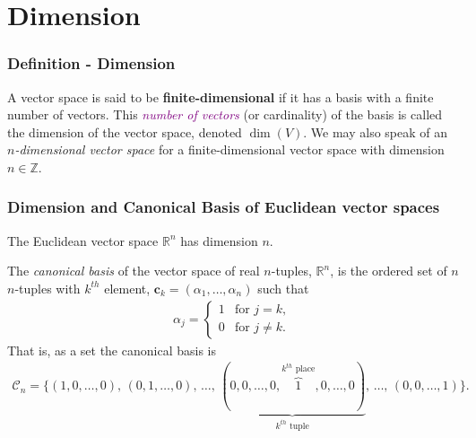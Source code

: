 \documentclass[usenames,dvipsnames,aspectratio=169,10pt]{beamer}
\numberwithin{equation}{section}
\begin{document}
\section{Dimension}

\begin{frame}
\frametitle{Definition - Dimension}
A vector space is said to be \textbf{finite-dimensional} if it has a basis with a finite number of vectors. This \textcolor{Purple}{\textit{number of vectors}} (or cardinality) of the basis is called the dimension of the vector space, denoted $\dim(V)$. We may also speak of an \textit{$n$-dimensional vector space} for a finite-dimensional vector space with dimension $n \in \mathbb{Z}$.
\end{frame}



\begin{frame}
\frametitle{Dimension and Canonical Basis of Euclidean vector spaces}

The Euclidean vector space $\mathbb{R}^n$ has dimension $n$.

The \textit{canonical basis} of the vector space of real $n$-tuples, $\mathbb{R}^n$, is the ordered set of $n$ $n$-tuples with $k^{th}$ element, $\mathbf{c}_k=(\alpha_1, \dots, \alpha_n)$ such that 
\begin{align*}
\alpha_j = 
\begin{cases} 
1 & \text{for } j= k, \\
0 & \text{for } j\neq k.
\end{cases}
\end{align*}
That is, as a set the canonical basis is
\begin{align*}
\mathcal{C}_n=\{ 
(1, 0, \dots, 0 ), \,
(0, 1, \dots, 0 ), \,
\dots, \,
\underbrace{(0, 0, \dots, 0, \overbrace{1}^{k^{th} \text{ place}}, 0, \dots, 0 )}_{k^{th} \text{ tuple}}, \,
\dots, \,
(0, 0, \dots, 1)
\}.
\end{align*}

\end{frame}
\end{document}
